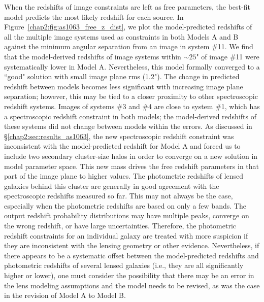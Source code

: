 When the redshifts of image constraints are left as free parameters, the best-fit model predicts the most likely redshift for each source.  In Figure~\ref{chap2:fig:as1063_free_z_dist}, we plot the model-predicted redshifts of all the multiple image systems used as constraints in both Models A and B against the minimum angular separation from an image in system \#11. We find that the model-derived redshifts of image systems within $\sim25$" of image \#11 were systematically lower in Model A. Nevertheless, this model formally converged to a ``good" solution with small image plane rms (1.2"). The change in predicted redshift between models becomes less significant with increasing image plane separation; however, this may be tied to a closer proximity to other spectroscopic redshift systems. Images of systems \#3 and \#4 are close to system \#1, which has a spectroscopic redshift constraint in both models; the model-derived redshifts of these systems did not change between models within the errors. As discussed in \S\ref{chap2:sec:results_as1063}, the new spectroscopic redshift constraint was inconsistent with the model-predicted redshift for Model A and forced us to include two secondary cluster-size halos in order to converge on a new solution in model parameter space. This new mass drives the free redshift parameters in that part of the image plane to higher values. The photometric redshifts of lensed galaxies behind this cluster \citep[derived from 16-band CLASH data, ][]{Jouvel:2014qy} are generally in good agreement with the spectroscopic redshifts measured so far. This may not always be the case, especially when the photometric redshifts are based on only a few bands. The output redshift probability distributions may have multiple peaks, converge on the wrong redshift, or have large uncertainties. Therefore, the photometric redshift constraints for an individual galaxy are treated with more suspicion if they are inconsistent with the lensing geometry or other evidence. Nevertheless, if there appears to be a systematic offset between the model-predicted redshifts and photometric redshifts of several lensed galaxies (i.e., they are all significantly higher or lower), one must consider the possibility that there may be an error in the lens modeling assumptions and the model needs to be revised, as was the case in the revision of Model A to Model B.

